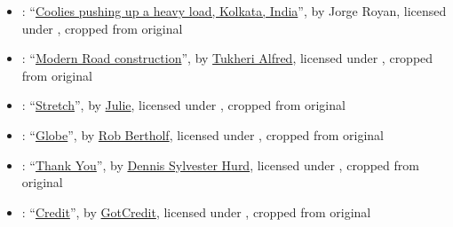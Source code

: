 \begin{itemize}
\item {}: ``\href{https://commons.wikimedia.org/wiki/File:India_-_Kolkata_coolies_-_3192.jpg}{Coolies pushing up a heavy load, Kolkata, India}'', by Jorge Royan, licensed under , cropped from original

\item {}: ``\href{https://commons.wikimedia.org/wiki/File:Charles_Alfred_a.k.a(Tukheri_Alfred)20.jpg}{Modern Road construction}'', by \href{https://commons.wikimedia.org/wiki/User:Tukheri_Alfred}{Tukheri Alfred}, licensed under , cropped from original

\item {}: ``\href{https://www.flickr.com/photos/julieeb/6121888498/}{Stretch}'', by \href{https://www.flickr.com/people/julieeb/}{Julie}, licensed under , cropped from original

\item {}: ``\href{https://www.flickr.com/photos/robbertholf/19644248265/}{Globe}'', by \href{https://www.flickr.com/people/robbertholf/}{Rob Bertholf}, licensed under , cropped from original

\item {}: ``\href{https://www.flickr.com/photos/dennissylvesterhurd/50161137826/}{Thank You}'', by \href{https://www.flickr.com/people/dennissylvesterhurd/}{Dennis Sylvester Hurd}, licensed under , cropped from original

\item {}: ``\href{https://www.flickr.com/photos/gotcredit/30023411230/}{Credit}'', by \href{https://www.gotcredit.com/}{GotCredit}, licensed under , cropped from original

\end{itemize}

